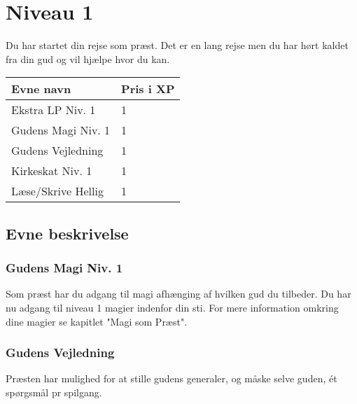 \chapter{Niveau 1}
Du har startet din rejse som præst. Det er en lang rejse men du har hørt kaldet fra din gud og vil hjælpe hvor du kan.

\begin{table}[H]
    \centering
    \begin{tabular}{|p{}|p{}|}
    \rowcolor{cerulean!80}\hline
        Evne navn & Pris i XP \\\hline
            Ekstra LP Niv. 1 & 1 \\\hline
            Gudens Magi Niv. 1 & 1 \\\hline
            Gudens Vejledning & 1 \\\hline
            Kirkeskat Niv. 1 & 1 \\\hline
            Læse/Skrive Hellig & 1 \\\hline
    \end{tabular}
\end{table}

\section{Evne beskrivelse}



\subsection{Gudens Magi Niv. 1}
Som præst har du adgang til magi afhænging af hvilken gud du tilbeder. Du har nu adgang til niveau 1 magier indenfor din sti. For mere information omkring dine magier se kapitlet "Magi som Præst".

\subsection{Gudens Vejledning}
Præsten har mulighed for at stille gudens generaler, og måske selve guden, ét spørgsmål pr spilgang.



